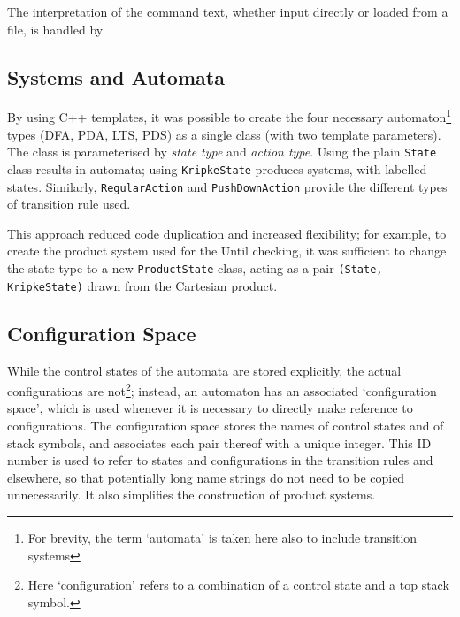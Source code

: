 \documentclass[11pt]{article}
\theoremstyle{definition}
\begin{document}
The interpretation of the command text, whether input directly or loaded from a file, is handled by 



\subsection{Systems and Automata}

By using C++ templates, it was possible to create the four necessary
automaton\footnote{For brevity, the term `automata' is taken here also to
include transition systems} types (DFA, PDA, LTS, PDS) as a single class (with
two template parameters).  The class is parameterised by \textit{state type}
and \textit{action type}.  Using the plain \texttt{State} class results in
automata; using \texttt{KripkeState} produces systems, with labelled states.
Similarly, \texttt{RegularAction} and \texttt{PushDownAction} provide the
different types of transition rule used.

This approach reduced code duplication and increased flexibility; for example,
to create the product system used for the Until checking, it was sufficient to
change the state type to a new \texttt{ProductState} class, acting as a pair
\texttt{(State, KripkeState)} drawn from the Cartesian product.

\subsection{Configuration Space}


While the control states of the automata are stored explicitly, the actual
configurations are not\footnote{Here `configuration' refers to a combination of
a control state and a top stack symbol.}; instead, an automaton has an
associated `configuration space', which is used whenever it is necessary to
directly make reference to configurations. The configuration space stores the
names of control states and of stack symbols, and associates each pair thereof
with a unique integer. This ID number is used to refer to states and
configurations in the transition rules and elsewhere, so that potentially long
name strings do not need to be copied unnecessarily. It also simplifies the
construction of product systems.



\end{document}
